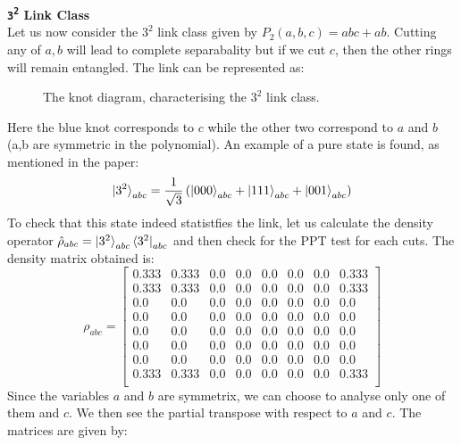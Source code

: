 \documentclass{scrartcl}
\begin{document}
            \textbf{\large \texttt{3\textsuperscript{2}} Link Class} \\[0.3cm]
Let us now consider the $3^2$ link class given by $P_2(a,b,c) = abc+ab$. Cutting any of $a,b$ will lead to complete separabality but if we cut $c$, then the other rings will remain entangled. The link can be represented as: 
\begin{figure}[H]
    \centering
    
  \caption{The knot diagram, characterising the $3^2$ link class.}
\end{figure}
\noindent
Here the blue knot corresponds to $c$ while the other two correspond to $a$ and $b$ (a,b are symmetric in the polynomial). An example of a pure state is found, as mentioned in the paper: 
$$\ket{3^2}_{abc} = \frac{1}{\sqrt{3}}\left( \ket{000}_{abc} + \ket{111}_{abc} + \ket{001}_{abc} \right) $$
To check that this state indeed statistfies the link, let us calculate the density operator $\hat{\rho}_{abc}=\ket{3^2}_{abc}\bra{3^2}_{abc}$ and then check for the PPT test for each cuts. 
The density matrix obtained is: 
\begin{equation}
    \rho_{abc}=
    \left[
    \begin{array}{cccccccc}
    0.333 & 0.333 & 0.0 & 0.0 & 0.0 & 0.0 & 0.0 & 0.333 \\
    0.333 & 0.333 & 0.0 & 0.0 & 0.0 & 0.0 & 0.0 & 0.333 \\
    0.0 & 0.0 & 0.0 & 0.0 & 0.0 & 0.0 & 0.0 & 0.0 \\
    0.0 & 0.0 & 0.0 & 0.0 & 0.0 & 0.0 & 0.0 & 0.0 \\
    0.0 & 0.0 & 0.0 & 0.0 & 0.0 & 0.0 & 0.0 & 0.0 \\
    0.0 & 0.0 & 0.0 & 0.0 & 0.0 & 0.0 & 0.0 & 0.0 \\
    0.0 & 0.0 & 0.0 & 0.0 & 0.0 & 0.0 & 0.0 & 0.0 \\
    0.333 & 0.333 & 0.0 & 0.0 & 0.0 & 0.0 & 0.0 & 0.333 \\
    \end{array}
    \right]
    \end{equation}
    Since the variables $a$ and $b$ are symmetrix, we can choose to analyse only one of them and $c$. We then see the partial transpose with respect to $a$ and $c$. The matrices are given by:
\end{document}
